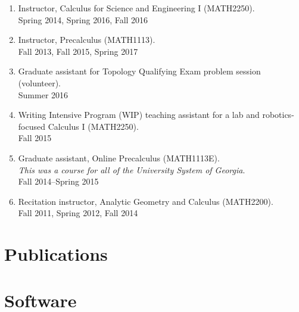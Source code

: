 \documentclass[letterpaper]{article}
\renewenvironment{itemize}{
  \begin{list}{}{
    \setlength{\leftmargin}{1.5em}
  }
}{
  \end{list}
}
\begin{document}
\begin{enumerate}
\item Instructor, Calculus for Science and Engineering I (MATH2250). \\
  Spring 2014, Spring 2016, Fall 2016
\item Instructor, Precalculus (MATH1113). \\
  Fall 2013, Fall 2015, Spring 2017
\item Graduate assistant for Topology Qualifying Exam problem session
  (volunteer). \\
  Summer 2016
\item Writing Intensive Program (WIP) teaching assistant for a lab and
  robotics-focused Calculus I (MATH2250). \\
  Fall 2015
\item Graduate assistant, Online Precalculus (MATH1113E). \\
  \emph{This was a course for all of the University System of Georgia}.\\
  Fall 2014--Spring 2015
\item Recitation instructor, Analytic Geometry and Calculus
  (MATH2200).\\
  Fall 2011, Spring 2012, Fall 2014

\end{enumerate}

\section*{Publications}

\nocite{*}
\printbibliography[heading=none]
\vspace{-.5em}
\nocite{*}
\printbibliography[heading=none]

\section*{Software}
\end{document}
